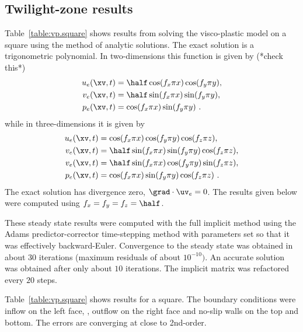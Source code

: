 \subsection{Twilight-zone results}

Table~\ref{table:vp.square} shows results from solving the visco-plastic model on a square using
the method of analytic solutions. The exact solution is a trigonometric polynomial. In 
two-dimensions this function is given by (*check this*)
\begin{align}
   u_e(\xv,t) &=  \half\cos(f_x \pi x )\cos(f_y \pi y)  , \\
   v_e(\xv,t) &=  \half\sin(f_x \pi x )\sin(f_y \pi y)  , \\
   p_e(\xv,t) &= \cos(f_x \pi x )\sin(f_y \pi y) ~.
\label{eq:vpTrig2D}
\end{align}
while in three-dimensions it is given by
\begin{align}
   u_e(\xv,t) &=       \cos(f_x \pi x )\cos(f_y \pi y)\cos(f_z \pi z)  , \\
   v_e(\xv,t) &=  \half\sin(f_x \pi x )\sin(f_y \pi y)\cos(f_z \pi z)  , \\
   v_e(\xv,t) &=  \half\sin(f_x \pi x )\cos(f_y \pi y)\sin(f_z \pi z)  , \\
   p_e(\xv,t) &=       \cos(f_x \pi x )\sin(f_y \pi y)\cos(f_z \pi z) ~.
\label{eq:vpTrig3D}
\end{align}
The exact solution has divergence zero, $\grad\cdot\uv_e=0$. 
The results given below were computed using $f_x=f_y=f_z=\half$. 

These steady state results were computed with the full implicit method using the Adams predictor-corrector
time-stepping method with parameters set so that it was effectively backward-Euler.
Convergence to the steady state was obtained in about $30$ iterations (maximum residuals of about $10^{-10})$.
An accurate solution was obtained after only about $10$ iterations. The implicit matrix was refactored
every $20$ steps. 


Table~\ref{table:vp.square} shows results for a square.
The boundary conditions were inflow on the left face, , outflow on the right face and no-slip walls on
the top and bottom. The errors are converging at close to 2nd-order.

